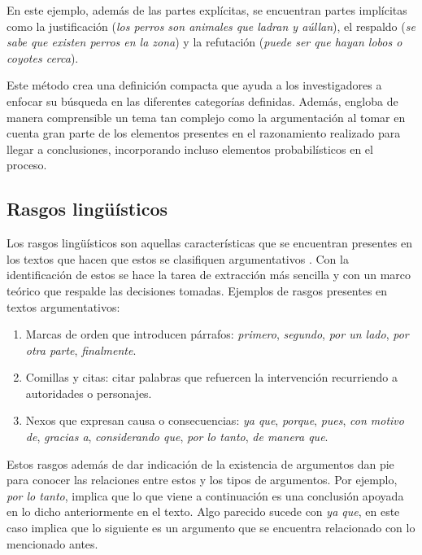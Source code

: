 \documentclass[a4paper,11pt,twocolumn,twoside]{article}
\begin{document}
En este ejemplo, además de las partes explícitas, se encuentran partes implícitas como la justificación 
(\textit{los perros son animales que ladran y aúllan}), el respaldo (\textit{se sabe que existen perros en la zona}) y 
la refutación (\textit{puede ser que hayan lobos o coyotes cerca}).

Este método crea una definición compacta que ayuda a los investigadores a enfocar su búsqueda 
en las diferentes categorías definidas. Además, engloba de manera comprensible un tema tan complejo 
como la argumentación al tomar en cuenta gran parte de los elementos presentes en el razonamiento
realizado para llegar a conclusiones, incorporando incluso elementos probabilísticos en el proceso. 

\subsection{Rasgos lingüísticos}

Los rasgos lingüísticos son aquellas características que se encuentran presentes en los textos 
que hacen que estos se clasifiquen argumentativos \cite{venegas2005hacia}. Con 
la identificación de estos se hace la tarea de extracción más sencilla y con un marco teórico 
que respalde las decisiones tomadas. Ejemplos de rasgos presentes en textos argumentativos:

\begin{enumerate}
	\item Marcas de orden que introducen párrafos: \textit{primero}, \textit{segundo}, \textit{por un lado},
	      \textit{por otra parte}, \textit{finalmente}.
	\item Comillas y citas: citar palabras que refuercen la intervención recurriendo a autoridades
	      o personajes.
	\item Nexos que expresan causa o consecuencias: \textit{ya que}, \textit{porque}, \textit{pues},
	      \textit{con motivo de}, \textit{gracias a}, \textit{considerando que}, \textit{por lo tanto}, \textit{de manera que}.
\end{enumerate}

Estos rasgos además de dar indicación de la existencia de argumentos dan pie para conocer las relaciones
entre estos y los tipos de argumentos. Por ejemplo, \textit{por lo tanto}, implica que lo que viene 
a continuación es una conclusión apoyada en lo dicho anteriormente en el texto. Algo parecido
sucede con \textit{ya que}, en este caso implica que lo siguiente es un argumento que se encuentra 
relacionado con lo mencionado antes.
\end{document}
